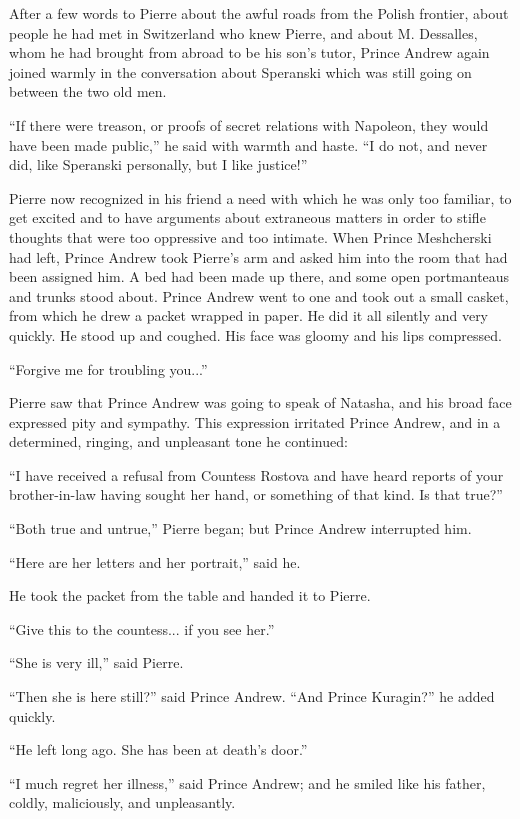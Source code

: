 After a few words to Pierre about the awful roads from the Polish
frontier, about people he had met in Switzerland who knew Pierre,
and about M. Dessalles, whom he had brought from abroad to be his
son's tutor, Prince Andrew again joined warmly in the
conversation about Speranski which was still going on between the
two old men.

``If there were treason, or proofs of secret relations with
Napoleon, they would have been made public,'' he said with warmth
and haste. ``I do not, and never did, like Speranski personally,
but I like justice!''

Pierre now recognized in his friend a need with which he was only
too familiar, to get excited and to have arguments about
extraneous matters in order to stifle thoughts that were too
oppressive and too intimate.  When Prince Meshcherski had left,
Prince Andrew took Pierre's arm and asked him into the room that
had been assigned him. A bed had been made up there, and some
open portmanteaus and trunks stood about. Prince Andrew went to
one and took out a small casket, from which he drew a packet
wrapped in paper. He did it all silently and very quickly. He
stood up and coughed. His face was gloomy and his lips
compressed.

``Forgive me for troubling you...''

Pierre saw that Prince Andrew was going to speak of Natasha, and
his broad face expressed pity and sympathy. This expression
irritated Prince Andrew, and in a determined, ringing, and
unpleasant tone he continued:

``I have received a refusal from Countess Rostova and have heard
reports of your brother-in-law having sought her hand, or
something of that kind. Is that true?''

``Both true and untrue,'' Pierre began; but Prince Andrew
interrupted him.

``Here are her letters and her portrait,'' said he.

He took the packet from the table and handed it to Pierre.

``Give this to the countess... if you see her.''

``She is very ill,'' said Pierre.

``Then she is here still?'' said Prince Andrew. ``And Prince
Kuragin?'' he added quickly.

``He left long ago. She has been at death's door.''

``I much regret her illness,'' said Prince Andrew; and he smiled
like his father, coldly, maliciously, and unpleasantly.


